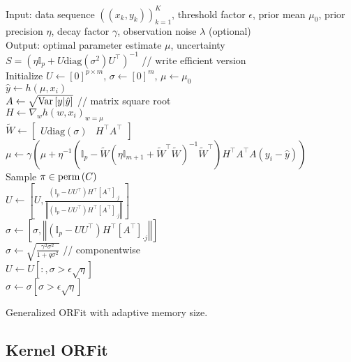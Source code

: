 \begin{algorithm}
\dontprintsemicolon
Input: data sequence $\left(\left(x_{k},y_{k}\right)\right)_{k=1}^{K}$,
threshold factor $\epsilon$, prior mean $\mu_{0}$, prior precision $\eta$,
decay factor $\gamma$, observation noise $\lambda$ (optional) \\
Output: optimal parameter estimate $\mu$, uncertainty
$S=\left(\eta\mathbb{I}_{p}+U\text{diag}(\sigma^2)U^{\top}\right)^{-1}$ // write efficient version\\
Initialize $U\leftarrow\left[0\right]^{p\times m}$, $\sigma\leftarrow\left[0\right]^{m}$,
$\mu\leftarrow\mu_{0}$ \\
 {
$\hat{y}\leftarrow h\left(\mu,x_{i}\right)$ \\
$A\leftarrow\sqrt{{\rm Var}\left[y\vert\hat{y}\right]}$ // matrix square root \\
$H\leftarrow\nabla_{w}h\left(w,x_{i}\right)_{w=\mu}$ \\
$\tilde{W}\leftarrow\left[\begin{array}{cc}U\text{diag}(\sigma) & H^{\top}A^{\top}\end{array}\right]$ \\
$\mu\leftarrow\gamma\left(\mu+\eta^{-1}\left(\mathbb{I}_{p}-\tilde{W}\left(\eta\mathbb{I}_{m+1}+\tilde{W}^{\top}\tilde{W}\right)^{-1}\tilde{W}^{\top}\right)H^{\top}A^{\top}A\left(y_{i}-\hat{y}\right)\right)$ \\
Sample $\pi\in{\rm perm}\left(C\right)$ \\
 { 
$U\leftarrow\left[U,\frac{\left(\mathbb{I}_{p}-UU^{\top}\right)H^{\top}\left[A^{\top}\right]_{\cdot j}}{\left\Vert \left(\mathbb{I}_{p}-UU^{\top}\right)H^{\top}\left[A^{\top}\right]_{\cdot j}\right\Vert }\right]$ \\
$\sigma\leftarrow\left[\sigma,\left\Vert \left(\mathbb{I}_{p}-UU^{\top}\right)H^{\top}\left[A^{\top}\right]_{\cdot j}\right\Vert \right]$ \\
}
$\sigma\leftarrow\sqrt{\frac{\gamma^{2}\sigma^{2}}{1+q\sigma^{2}}}$ // componentwise \\
$U\leftarrow U[:,\sigma>\epsilon\sqrt{\eta}]$\\
$\sigma\leftarrow \sigma[\sigma>\epsilon\sqrt{\eta}]$ \\
}
\caption{\label{alg:ORFit-general}Generalized ORFit with adaptive memory size.}
\end{algorithm}

\subsection{Kernel ORFit}

